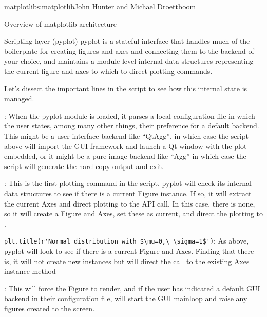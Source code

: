 \begin{aosachapter}{matplotlib}{s:matplotlib}{John Hunter and Michael Droettboom}
\begin{aosasect1}{Overview of matplotlib architecture}
\begin{aosasect2}{Scripting layer (pyplot)}
pyplot is a stateful interface that handles much of the boilerplate
for creating figures and axes and connecting them to the backend of
your choice, and maintains a module level internal data structures
representing the current figure and axes to which to direct plotting
commands.

Let's dissect the important lines in the script to see how this
internal state is managed.

\begin{aosaitemize}

  \item {}: When the pyplot module
    is loaded, it parses a local configuration file in which the user
    states, among many other things, their preference for a default
    backend.  This might be a user interface backend like ``QtAgg'',
    in which case the script above will import the GUI framework and
    launch a Qt window with the plot embedded, or it might be a pure
    image backend like ``Agg'' in which case the script will generate
    the hard-copy output and exit.

  \item {}: This is the first plotting command
    in the script.  pyplot will check its internal data structures to
    see if there is a current Figure instance.  If so, it will extract
    the current Axes and direct plotting to the  API
    call.  In this case, there is none, so it will create a Figure and
    Axes, set these as current, and direct the plotting to
    .

  \item \verb+plt.title(r'Normal distribution with $\mu=0,\ \sigma=1$')+:
    As above, pyplot will look to see if there
    is a current Figure and Axes.  Finding that there is, it will not
    create new instances but will direct the call to the existing Axes
    instance method 

  \item {}: This will force the Figure to render, and
    if the user has indicated a default GUI backend in their
    configuration file, will start the GUI mainloop and raise any
    figures created to the screen.

\end{aosaitemize}


\end{aosasect2}
\end{aosasect1}
\end{aosachapter}

